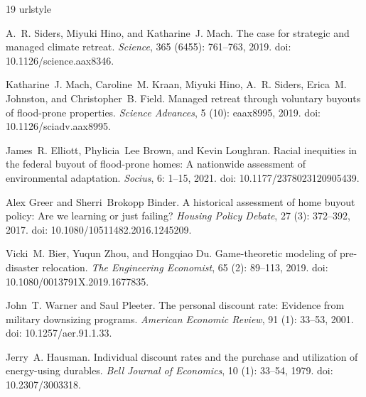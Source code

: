 \documentclass[11pt,letterpaper]{article}
\theoremstyle{definition}
\begin{document}
\begin{thebibliography}{19}
\providecommand{\natexlab}[1]{#1}
\providecommand{\url}[1]{\texttt{#1}}
\expandafter\ifx\csname urlstyle\endcsname\relax
  \providecommand{\doi}[1]{doi: #1}\else
  \providecommand{\doi}{doi: \begingroup \urlstyle{rm}\Url}\fi

A.~R. Siders, Miyuki Hino, and Katharine~J. Mach.
\newblock The case for strategic and managed climate retreat.
\newblock \emph{Science}, 365 (6455): 761--763, 2019.
\newblock \doi{10.1126/science.aax8346}.

Katharine~J. Mach, Caroline~M. Kraan, Miyuki Hino, A.~R. Siders, Erica~M.
  Johnston, and Christopher~B. Field.
\newblock Managed retreat through voluntary buyouts of flood-prone properties.
\newblock \emph{Science Advances}, 5 (10): eaax8995, 2019.
\newblock \doi{10.1126/sciadv.aax8995}.

James~R. Elliott, Phylicia~Lee Brown, and Kevin Loughran.
\newblock Racial inequities in the federal buyout of flood-prone homes: A
  nationwide assessment of environmental adaptation.
\newblock \emph{Socius}, 6: 1--15, 2021.
\newblock \doi{10.1177/2378023120905439}.

Alex Greer and Sherri~Brokopp Binder.
\newblock A historical assessment of home buyout policy: Are we learning or
  just failing?
\newblock \emph{Housing Policy Debate}, 27 (3): 372--392,
  2017.
\newblock \doi{10.1080/10511482.2016.1245209}.

Vicki~M. Bier, Yuqun Zhou, and Hongqiao Du.
\newblock Game-theoretic modeling of pre-disaster relocation.
\newblock \emph{The Engineering Economist}, 65 (2): 89--113,
  2019.
\newblock \doi{10.1080/0013791X.2019.1677835}.

John~T. Warner and Saul Pleeter.
\newblock The personal discount rate: Evidence from military downsizing
  programs.
\newblock \emph{American Economic Review}, 91 (1): 33--53,
  2001.
\newblock \doi{10.1257/aer.91.1.33}.

Jerry~A. Hausman.
\newblock Individual discount rates and the purchase and utilization of
  energy-using durables.
\newblock \emph{Bell Journal of Economics}, 10 (1): 33--54,
  1979.
\newblock \doi{10.2307/3003318}.


\end{thebibliography}
\end{document}
